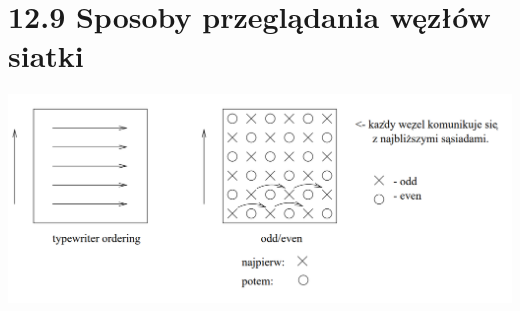 \section{12.9 Sposoby przeglądania węzłów siatki}

\begin{frame}{}
\includegraphics[height=0.6\textheight, width=1\textwidth]{img/12/iteracja3}
\end{frame}
